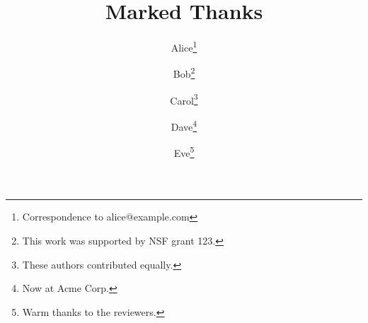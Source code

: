 \documentclass{article}
\begin{document}
\author{Alice\thanks{Correspondence to alice@example.com}
  \and Bob\thanks{This work was supported by NSF grant 123.}
  \and Carol\thanks{These authors contributed equally.}
  \and Dave\thanks{Now at Acme Corp.}
  \and Eve\thanks{Warm thanks to the reviewers.}}
\title{Marked Thanks}\maketitle
\end{document}
